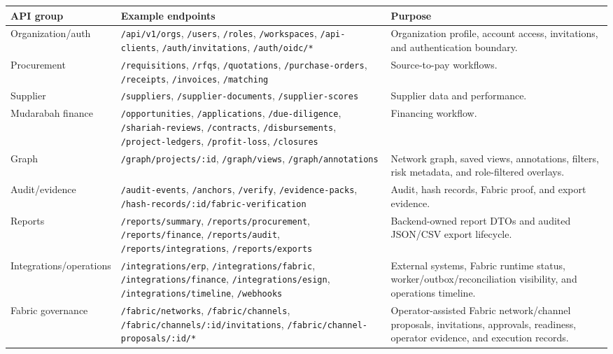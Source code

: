 \documentclass[11pt,a4paper]{article}
\begin{document}
\begin{longtable}{L{36mm}L{58mm}L{42mm}}
\toprule
\textbf{API group} & \textbf{Example endpoints} & \textbf{Purpose} \\
\midrule
Organization/auth & \texttt{/api/v1/orgs}, \texttt{/users}, \texttt{/roles}, \texttt{/workspaces}, \texttt{/api-clients}, \texttt{/auth/invitations}, \texttt{/auth/oidc/*} & Organization profile, account access, invitations, and authentication boundary. \\
Procurement & \texttt{/requisitions}, \texttt{/rfqs}, \texttt{/quotations}, \texttt{/purchase-orders}, \texttt{/receipts}, \texttt{/invoices}, \texttt{/matching} & Source-to-pay workflows. \\
Supplier & \texttt{/suppliers}, \texttt{/supplier-documents}, \texttt{/supplier-scores} & Supplier data and performance. \\
Mudarabah finance & \texttt{/opportunities}, \texttt{/applications}, \texttt{/due-diligence}, \texttt{/shariah-reviews}, \texttt{/contracts}, \texttt{/disbursements}, \texttt{/project-ledgers}, \texttt{/profit-loss}, \texttt{/closures} & Financing workflow. \\
Graph & \texttt{/graph/projects/:id}, \texttt{/graph/views}, \texttt{/graph/annotations} & Network graph, saved views, annotations, filters, risk metadata, and role-filtered overlays. \\
Audit/evidence & \texttt{/audit-events}, \texttt{/anchors}, \texttt{/verify}, \texttt{/evidence-packs}, \texttt{/hash-records/:id/fabric-verification} & Audit, hash records, Fabric proof, and export evidence. \\
Reports & \texttt{/reports/summary}, \texttt{/reports/procurement}, \texttt{/reports/finance}, \texttt{/reports/audit}, \texttt{/reports/integrations}, \texttt{/reports/exports} & Backend-owned report DTOs and audited JSON/CSV export lifecycle. \\
Integrations/operations & \texttt{/integrations/erp}, \texttt{/integrations/fabric}, \texttt{/integrations/finance}, \texttt{/integrations/esign}, \texttt{/integrations/timeline}, \texttt{/webhooks} & External systems, Fabric runtime status, worker/outbox/reconciliation visibility, and operations timeline. \\
Fabric governance & \texttt{/fabric/networks}, \texttt{/fabric/channels}, \texttt{/fabric/channels/:id/invitations}, \texttt{/fabric/channel-proposals/:id/*} & Operator-assisted Fabric network/channel proposals, invitations, approvals, readiness, operator evidence, and execution records. \\
\bottomrule
\end{longtable}
\end{document}
